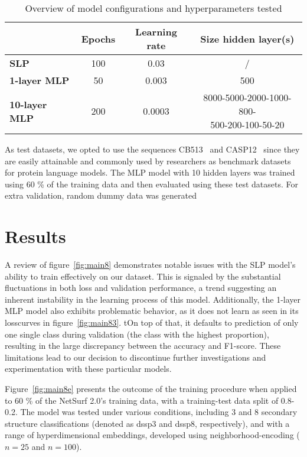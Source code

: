 \begin{table}[h]
    \caption{Overview of model configurations and hyperparameters tested}
    \label{tab:casp3}
    \centering
    \begin{tabular}{l|ccc}
        \toprule
         & Epochs & Learning rate & Size hidden layer(s)\\
        \midrule
        \textbf{SLP} & 100 & 0.03 & /\\
        \hline
        \textbf{1-layer MLP} & 50 & 0.003 & 500\\
        \hline
        \textbf{10-layer MLP} & 200 & 0.0003 & \makecell{8000-5000-2000-1000-800-\\500-200-100-50-20}\\
        \bottomrule
    \end{tabular}
  \end{table}

As test datasets, we opted to use the sequences CB513~\cite{cb513} and CASP12~\cite{casp12} since they are easily attainable and commonly used by researchers as benchmark datasets for protein language models. The MLP model with 10 hidden layers was trained using 60 \% of the training data and then evaluated using these test datasets. For extra validation, random dummy data was generated 

\section{Results}
A review of figure~\ref{fig:main8} demonstrates notable issues with the SLP model's ability to train effectively on our dataset. This is signaled by the substantial fluctuations in both loss and validation performance, a trend suggesting an inherent instability in the learning process of this model. Additionally, the 1-layer MLP model also exhibits problematic behavior, as it does not learn as seen in its losscurves in figure~\ref{fig:main83}. tOn top of that, it defaults to prediction of only one single class during validation (the class with the highest proportion), resulting in the large discrepancy between the accuracy and F1-score. These limitations lead to our decision to discontinue further investigations and experimentation with these particular models.

Figure~\ref{fig:main8e} presents the outcome of the training procedure when applied to 60 \% of the NetSurf 2.0's training data, with a training-test data split of 0.8-0.2. The model was tested under various conditions, including 3 and 8 secondary structure classifications (denoted as dssp3 and dssp8, respectively), and with a range of hyperdimensional embeddings, developed using neighborhood-encoding ($n = 25$ and $n=100$).

